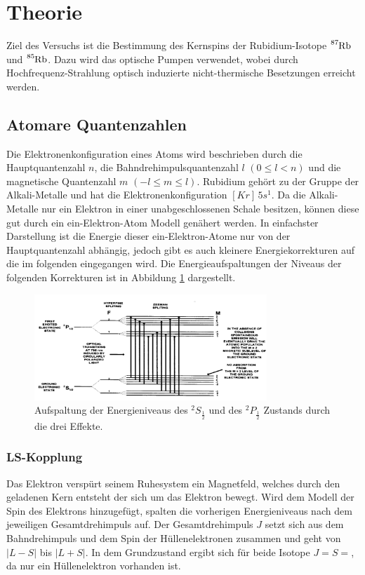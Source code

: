 \section{Theorie}
\label{sec:Theorie}
Ziel des Versuchs ist die Bestimmung des Kernspins der Rubidium-Isotope $\ce{^{87}Rb}$ und $\ce{^{85}Rb}$.
Dazu wird das optische Pumpen verwendet, wobei durch Hochfrequenz-Strahlung optisch induzierte nicht-thermische Besetzungen erreicht werden.

\subsection{Atomare Quantenzahlen}
Die Elektronenkonfiguration eines Atoms wird beschrieben durch die Hauptquantenzahl $n$, die Bahndrehimpulsquantenzahl $l$ $(0 \leq l < n)$ und die
magnetische Quantenzahl $m$ $(-l \leq m \leq l)$. 
Rubidium gehört zu der Gruppe der Alkali-Metalle und hat die
Elektronenkonfiguration $[Kr]\,5s^1$. 
Da die Alkali-Metalle nur ein Elektron in einer unabgeschlossenen Schale besitzen, können diese gut durch ein ein-Elektron-Atom Modell genähert werden.
In einfachster Darstellung ist die Energie dieser ein-Elektron-Atome nur von der Hauptquantenzahl abhängig, jedoch gibt es auch kleinere Energiekorrekturen
auf die im folgenden eingegangen wird. Die Energieaufspaltungen der Niveaus der folgenden Korrekturen ist in Abbildung \ref{pic:en} dargestellt.
\begin{figure}
    \centering
    \includegraphics[width = 0.78\textwidth]{pics/energielevel.png}
    \caption{Aufspaltung der Energieniveaus des $^2S_{\frac{1}{2}}$ und des $^2P_{\frac{1}{2}}$ Zustands durch die drei Effekte.\cite{op}}
    \label{pic:en}
\end{figure}

\subsubsection{LS-Kopplung}
Das Elektron verspürt seinem Ruhesystem ein Magnetfeld, welches durch den geladenen Kern entsteht der sich um das Elektron bewegt.
Wird dem Modell der Spin des Elektrons hinzugefügt, spalten die vorherigen Energieniveaus nach dem jeweiligen Gesamtdrehimpuls auf.
Der Gesamtdrehimpuls $J$ setzt sich aus dem Bahndrehimpuls und dem Spin der Hüllenelektronen zusammen und geht von $|L - S|$ bis $|L + S|$.
In dem Grundzustand ergibt sich für beide Isotope $J = S =$, da nur ein Hüllenelektron vorhanden ist.

